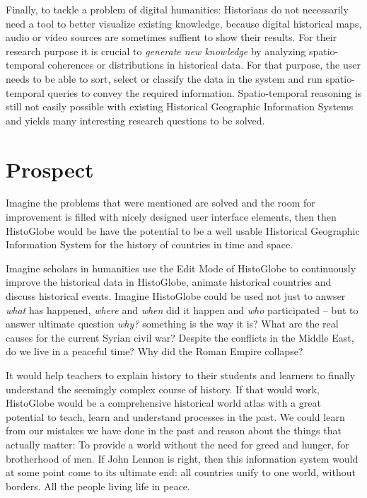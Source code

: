 Finally, to tackle a problem of digital humanities: Historians do not necessarily need a tool to better visualize existing knowledge, because digital historical maps, audio or video sources are sometimes suffient to show their results. For their research purpose it is crucial to \emph{generate new knowledge} by analyzing spatio-temporal coherences or distributions in historical data. For that purpose, the user needs to be able to sort, select or classify the data in the system and run spatio-temporal queries to convey the required information. Spatio-temporal reasoning is still not easily possible with existing Historical Geographic Information Systems and yields many interesting research questions to be solved.


\section{Prospect} %
\label{sec:prospect}

Imagine the problems that were mentioned are solved and the room for improvement is filled with nicely designed user interface elements, then then HistoGlobe would be have the potential to be a well usable Historical Geographic Information System for the history of countries in time and space.

Imagine scholars in humanities use the Edit Mode of HistoGlobe to continuously improve the historical data in HistoGlobe, animate historical countries and discuss historical events. Imagine HistoGlobe could be used not just to anwser \emph{what} has happened, \emph{where} and \emph{when} did it happen and \emph{who} participated -- but to answer ultimate question \emph{why?} something is the way it is?
What are the real causes for the current Syrian civil war?
Despite the conflicts in the Middle East, do we live in a peaceful time?
Why did the Roman Empire collapse?

It would help teachers to explain history to their students and learners to finally understand the seemingly complex course of history. If that would work, HistoGlobe would be a comprehensive historical world atlas with a great potential to teach, learn and understand processes in the past. We could learn from our mistakes we have done in the past and reason about the things that actually matter: To provide a world without the need for greed and hunger, for brotherhood of men. If John Lennon is right, then this information system would at some point come to its ultimate end: all countries unify to one world, without borders. All the people living life in peace.

